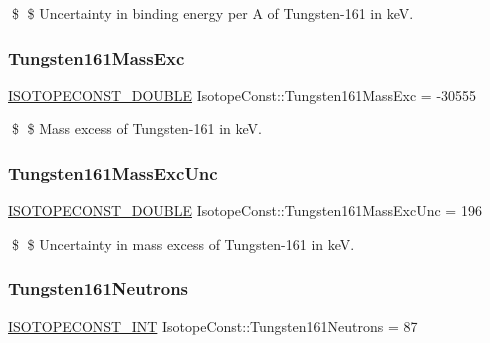 \$ \$ Uncertainty in binding energy per A of Tungsten-\/161 in keV. \mbox{\label{group___isotope_const-_tungsten-_w161_ga23031469e6981582ea2af7603250046e}} 
\subsubsection{\texorpdfstring{Tungsten161\+Mass\+Exc}{Tungsten161MassExc}}
{\footnotesize\ttfamily \mbox{\hyperlink{group___isotope_const-_macros_ga8f45a7272ce02c0b4c65c44636ed719a}{I\+S\+O\+T\+O\+P\+E\+C\+O\+N\+S\+T\+\_\+\+D\+O\+U\+B\+LE}} Isotope\+Const\+::\+Tungsten161\+Mass\+Exc = -\/30555}

\$ \$ Mass excess of Tungsten-\/161 in keV. \mbox{\label{group___isotope_const-_tungsten-_w161_gaf7e655c7e2b14ff0e20d281bb29c313f}} 
\subsubsection{\texorpdfstring{Tungsten161\+Mass\+Exc\+Unc}{Tungsten161MassExcUnc}}
{\footnotesize\ttfamily \mbox{\hyperlink{group___isotope_const-_macros_ga8f45a7272ce02c0b4c65c44636ed719a}{I\+S\+O\+T\+O\+P\+E\+C\+O\+N\+S\+T\+\_\+\+D\+O\+U\+B\+LE}} Isotope\+Const\+::\+Tungsten161\+Mass\+Exc\+Unc = 196}

\$ \$ Uncertainty in mass excess of Tungsten-\/161 in keV. \mbox{\label{group___isotope_const-_tungsten-_w161_ga6b034f75e57adb95397b8a113505675b}} 
\subsubsection{\texorpdfstring{Tungsten161\+Neutrons}{Tungsten161Neutrons}}
{\footnotesize\ttfamily \mbox{\hyperlink{group___isotope_const-_macros_ga5f18360b3e99483a35c32d789e62621c}{I\+S\+O\+T\+O\+P\+E\+C\+O\+N\+S\+T\+\_\+\+I\+NT}} Isotope\+Const\+::\+Tungsten161\+Neutrons = 87}

